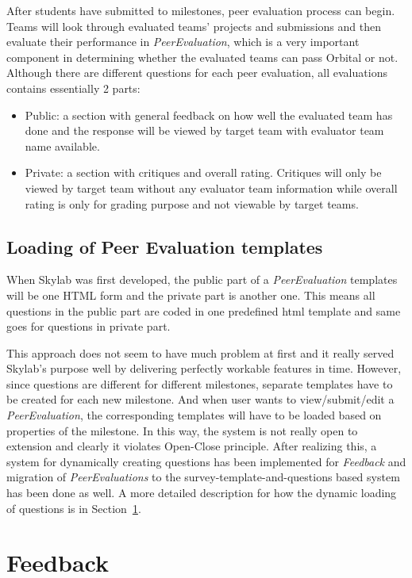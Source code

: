  After students have submitted to milestones, peer evaluation process can begin. Teams will look through evaluated teams' projects and submissions and then evaluate their performance in \textit{PeerEvaluation}, which is a very important component in determining whether the evaluated teams can pass Orbital or not. Although there are different questions for each peer evaluation, all evaluations contains essentially 2 parts:

 \begin{itemize}
  \item Public: a section with general feedback on how well the evaluated team has done and the response will be viewed by target team with evaluator team name available.
  \item Private: a section with critiques and overall rating. Critiques will only be viewed by target team without any evaluator team information while overall rating is only for grading purpose and not viewable by target teams.
\end{itemize}

\subsection{Loading of Peer Evaluation templates}

When Skylab was first developed, the public part of a \textit{PeerEvaluation} templates will be one HTML form and the private part is another one. This means all questions in the public part are coded in one predefined html template and same goes for questions in private part.

This approach does not seem to have much problem at first and it really served Skylab's purpose well by delivering perfectly workable features in time. However, since questions are different for different milestones, separate templates have to be created for each new milestone. And when user wants to view/submit/edit a \textit{PeerEvaluation}, the corresponding templates will have to be loaded based on properties of the milestone. In this way, the system is not really open to extension and clearly it violates Open-Close principle. After realizing this, a system for dynamically creating questions has been implemented for \textit{Feedback} and migration of \textit{PeerEvaluations} to the survey-template-and-questions based system has been done as well. A more detailed description for how the dynamic loading of questions is in Section~\ref{feedback}.

\section{Feedback} \label{feedback}

